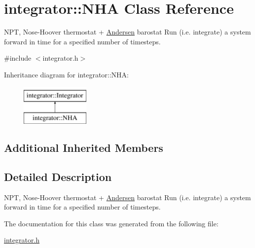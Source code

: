 \hypertarget{classintegrator_1_1NHA}{\section{integrator\-:\-:N\-H\-A Class Reference}
\label{classintegrator_1_1NHA}
}


N\-P\-T, Nose-\/\-Hoover thermostat + \hyperlink{classintegrator_1_1Andersen}{Andersen} barostat Run (i.\-e. integrate) a system forward in time for a specified number of timesteps.  




{\ttfamily \#include $<$integrator.\-h$>$}

Inheritance diagram for integrator\-:\-:N\-H\-A\-:\begin{figure}[H]
\begin{center}
\leavevmode
\includegraphics[height=2.000000cm]{classintegrator_1_1NHA}
\end{center}
\end{figure}
\subsection*{Additional Inherited Members}


\subsection{Detailed Description}
N\-P\-T, Nose-\/\-Hoover thermostat + \hyperlink{classintegrator_1_1Andersen}{Andersen} barostat Run (i.\-e. integrate) a system forward in time for a specified number of timesteps. 

The documentation for this class was generated from the following file\-:\begin{DoxyCompactItemize}
\item 
\hyperlink{integrator_8h}{integrator.\-h}\end{DoxyCompactItemize}
